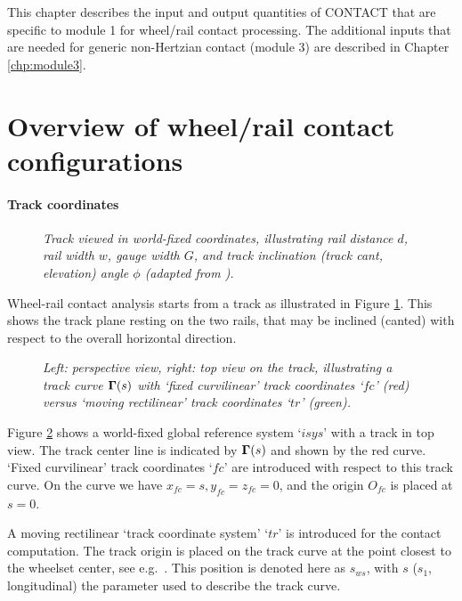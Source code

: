 \documentclass[12pt]{report}
\begin{document}
This chapter describes the input and output quantities of CONTACT that are
specific to module 1 for wheel/rail contact processing. The additional
inputs that are needed for generic non-Hertzian contact (module 3) are
described in Chapter \ref{chp:module3}.

\section{Overview of wheel/rail contact configurations}
\label{sec:wr_coords}

\paragraph{Track coordinates}

\begin{figure}[bt]
\centering
{}
\caption{\em Track viewed in world-fixed coordinates, illustrating rail
distance $d$, rail width $w$, gauge width $G$, and track inclination
(track cant, elevation) angle $\phi$ (adapted from \cite{Shabana2008}).}
\label{fig:world_coords}
\end{figure}

Wheel-rail contact analysis starts from a track as illustrated in Figure
\ref{fig:world_coords}. This shows the track plane resting on the two
rails, that may be inclined (canted) with respect to the overall horizontal
direction. 

\begin{figure}[bt]
\centering
{}
\caption{\em Left: perspective view, right: top view on the track,
        illustrating a track curve $\boldsymbol{\Gamma}(s)$ with `fixed curvilinear'
        track coordinates `$fc$' (red) versus `moving rectilinear' track
        coordinates `$tr$' (green).}
\label{fig:fc_coords}
\end{figure}

Figure \ref{fig:fc_coords} shows a world-fixed global reference system
`$isys$' with a track in top view. The track center line is indicated by
$\boldsymbol{\Gamma}(s)$ and shown by the red curve. `Fixed curvilinear' track
coordinates `$fc$' are introduced with respect to this track curve. On the
curve we have $x_{fc}=s, y_{fc}=z_{fc}=0$, and the origin $O_{fc}$ is
placed at $s=0$.

A moving rectilinear `track coordinate system' `$tr$' is introduced for the
contact computation. The track origin is placed on the track
curve at the point closest to the wheelset center, see e.g.\ 
\cite{Malvezzi2008}. This position is denoted here as $s_{ws}$, with $s$
($s_1$, longitudinal) the parameter used to describe the track curve.
\end{document}
